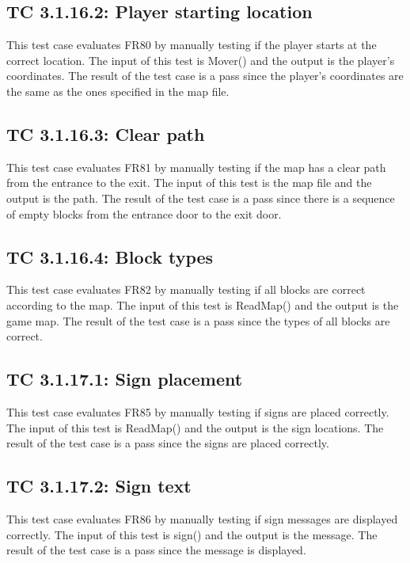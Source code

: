 \documentclass[12pt, titlepage]{article}
\begin{document}
\subsection*{TC 3.1.16.2: Player starting location}

This test case evaluates FR80 by manually testing if the player starts at the correct location. The input of this test is Mover() and the output is the player's coordinates. The result of the test case is a pass since the player's coordinates are the same as the ones specified in the map file.

\subsection*{TC 3.1.16.3: Clear path}

This test case evaluates FR81 by manually testing if the map has a clear path from the entrance to the exit. The input of this test is the map file and the output is the path. The result of the test case is a pass since there is a sequence of empty blocks from the entrance door to the exit door.

\subsection*{TC 3.1.16.4: Block types}

This test case evaluates FR82 by manually testing if all blocks are correct according to the map. The input of this test is ReadMap() and the output is the game map. The result of the test case is a pass since the types of all blocks are correct.

\subsection*{TC 3.1.17.1: Sign placement}

This test case evaluates FR85 by manually testing if signs are placed correctly. The input of this test is ReadMap() and the output is the sign locations. The result of the test case is a pass since the signs are placed correctly.

\subsection*{TC 3.1.17.2: Sign text}

This test case evaluates FR86 by manually testing if sign messages are displayed correctly. The input of this test is sign() and the output is the message. The result of the test case is a pass since the message is displayed.
\end{document}
